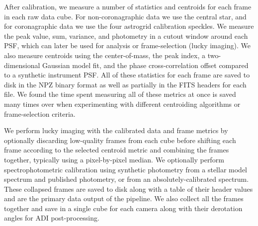 After calibration, we measure a number of statistics and centroids for each frame in each raw data cube. For non-coronagraphic data we use the central star, and for coronagraphic data we use the four astrogrid calibration speckles. We measure the peak value, sum, variance, and photometry in a cutout window around each PSF, which can later be used for analysis or frame-selection (lucky imaging). We also measure centroids using the center-of-mass, the peak index, a two-dimensional Gaussian model fit, and the phase cross-correlation offset compared to a synthetic instrument PSF. All of these statistics for each frame are saved to disk in the NPZ binary format as well as partially in the FITS headers for each file. We found the time spent measuring all of these metrics at once is saved many times over when experimenting with different centroiding algorithms or frame-selection criteria.

We perform lucky imaging with the calibrated data and frame metrics by optionally discarding low-quality frames from each cube before shifting each frame according to the selected centroid metric and combining the frames together, typically using a pixel-by-pixel median. We optionally perform spectrophotometric calibration using synthetic photometry from a stellar model spectrum and published photometry, or from an absolutely-calibrated spectrum. These collapsed frames are saved to disk along with a table of their header values and are the primary data output of the pipeline. We also collect all the frames together and save in a single cube for each camera along with their derotation angles for ADI post-processing.


